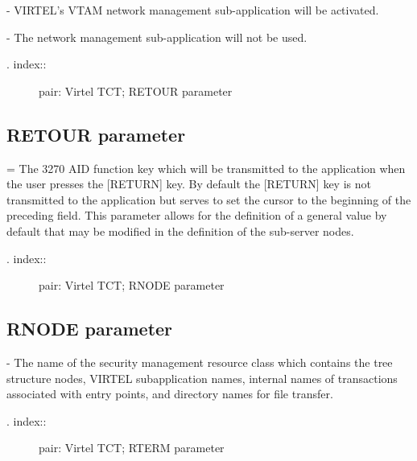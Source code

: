 \documentclass[letterpaper,10pt,english]{sphinxmanual}
\begin{document}
 - VIRTEL’s VTAM network management sub-application will be activated.

 - The network management sub-application will not be used.
\begin{description}
\item[{. index::}] \leavevmode
pair: Virtel TCT; RETOUR parameter

\end{description}


\subsection{RETOUR parameter}
\label{\detokenize{Installation_Guide:retour-parameter}}
\begin{sphinxVerbatim}[commandchars=\\\{\}]
 
\end{sphinxVerbatim}

 = The 3270 AID function key which will be transmitted to the application when the user presses the {[}RETURN{]} key. By default the {[}RETURN{]} key is not transmitted to the application but serves to set the cursor to the beginning of the preceding field. This parameter allows for the definition of a general value by default that may be modified in the definition of the sub-server nodes.
\begin{description}
\item[{. index::}] \leavevmode
pair: Virtel TCT; RNODE parameter

\end{description}


\subsection{RNODE parameter}
\label{\detokenize{Installation_Guide:rnode-parameter}}
\begin{sphinxVerbatim}[commandchars=\\\{\}]
 
\end{sphinxVerbatim}

 - The name of the security management resource class which contains the tree structure nodes, VIRTEL subapplication names, internal names of transactions associated with entry points, and directory names for file transfer.
\begin{description}
\item[{. index::}] \leavevmode
pair: Virtel TCT; RTERM parameter

\end{description}
\end{document}
